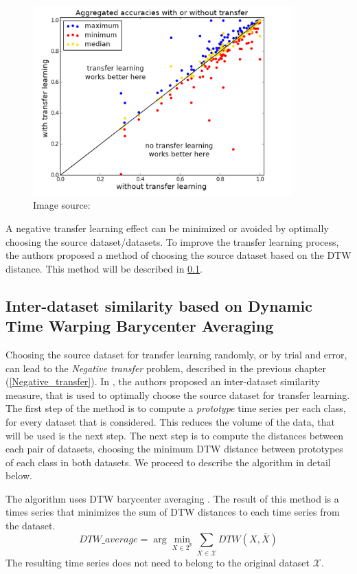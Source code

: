 \documentclass[a4paper,11pt,twoside]{report}
\theoremstyle{definition}
\DeclareMathOperator{\real}{\mathbb{R}}
\begin{document}
\begin{figure}[h!]
\centering
\includegraphics[width=10cm]{imgs/max_min_transfer_learning.png}
\caption{Image source: \cite{transfer_learning_time_series}}
\label{fig:tr_learning_min_max}
\end{figure}
\FloatBarrier
A negative transfer learning effect can be minimized or avoided by optimally choosing the source dataset/datasets. To improve the transfer learning process, the authors proposed a method of choosing the source dataset based on the DTW distance. This method will be described in \ref{DTW_choosing}.

\subsection{Inter-dataset similarity based on Dynamic Time Warping Barycenter Averaging} \label{DTW_choosing}
Choosing the source dataset for transfer learning randomly, or by trial and error, can lead to the \textit{Negative transfer} problem, described in the previous chapter (\ref{Negative_transfer}). In \cite{transfer_learning_time_series}, the authors proposed an inter-dataset similarity measure, that is used to optimally choose the source dataset for transfer learning. The first step of the method is to compute a \textit{prototype} time series per each class, for every dataset that is considered. This reduces the volume of the data, that will be used is the next step. The next step is to compute the distances between each pair of datasets, choosing the minimum DTW distance between prototypes of each class in both datasets. We proceed to describe the algorithm in detail below.

The algorithm uses DTW barycenter averaging \cite{dtw_dba}.  The result of this method is a times series that minimizes the sum of DTW distances to each time series from the dataset.
$$DTW\_average = \arg\min_{X \in  2^{\real}}  \sum_{\bar{X}\in \mathcal{X}} DTW(X, \bar{X})$$
The resulting time series does not need to belong to the original dataset $\mathcal{X}$.
\end{document}
